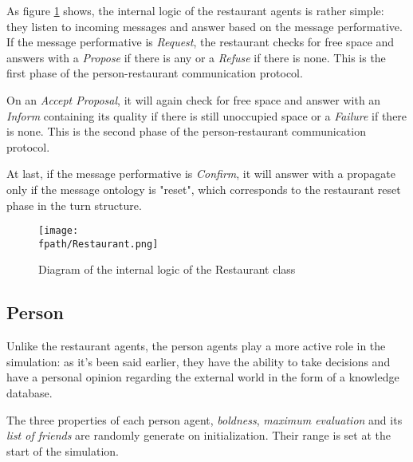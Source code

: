 \documentclass[10pt,a4paper]{article}
\newcommand{\fpath}{./Figs/}
\begin{document}
As figure \ref{fig:restaurant_flow} shows, the internal logic of the restaurant agents is rather simple: they listen to incoming messages and answer based on the message performative. If the message performative is \textit{Request}, the restaurant checks for free space and answers with a \textit{Propose} if there is any or a \textit{Refuse} if there is none. This is the first phase of the person-restaurant communication protocol.

On an \textit{Accept Proposal}, it will again check for free space and answer with an \textit{Inform} containing its quality if there is still unoccupied space or a \textit{Failure} if there is none. This is the second phase of the person-restaurant communication protocol. 

At last, if the message performative is \textit{Confirm}, it will answer with a propagate only if the message ontology is "reset", which corresponds to the restaurant reset phase in the turn structure.
\begin{figure}
\texttt{[image: \\fpath/Restaurant.png]}
\caption{Diagram of the internal logic of the Restaurant class}
\label{fig:restaurant_flow}
\end{figure}

\subsection{Person}
Unlike the restaurant agents, the person agents play a more active role in the simulation: as it's been said earlier, they have the ability to take decisions and have a personal opinion regarding the external world in the form of a knowledge database.

The three properties of each person agent, \textit{boldness}, \textit{maximum evaluation} and its \textit{list of friends} are randomly generate on initialization. Their range is set at the start of the simulation.
\end{document}
